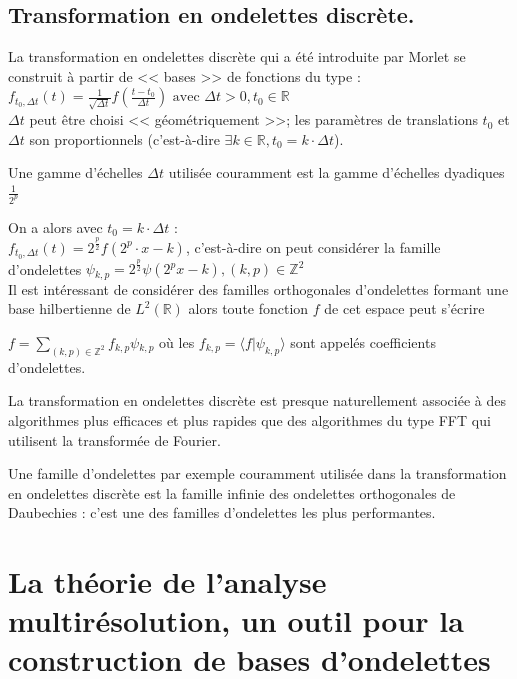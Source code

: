 \documentclass{article}
\begin{document}
\subsection{Transformation en ondelettes discrète.}

La transformation en ondelettes discrète qui a été introduite par Morlet se construit à partir de << bases >> de fonctions du type : \\

$\displaystyle f_{t_{0},\Delta{}t}(t) = \frac{1}{\sqrt{\Delta{}t}}f\left(\frac{t-t_0}{\Delta{}t}\right) \text{ avec } \Delta{}t > 0, t_0 \in \mathbb{R}$ \\

$\Delta{}t$ peut être choisi << géométriquement >>; les paramètres de translations $t_0$ et $\Delta{}t$ son proportionnels (c'est-à-dire $\exists k \in \mathbb{R}, t_0 = k\cdot{}\Delta{}t$).

Une gamme d'échelles $\Delta{}t$ utilisée couramment est la gamme d'échelles dyadiques $\frac{1}{2^p}$

On a alors avec $t_0 = k\cdot\Delta{}t$ : \\

$\displaystyle f_{t_{0},\Delta{}t}(t) = 2^{\frac{p}{2}}f(2^{p}\cdot{}x - k)$, c'est-à-dire on peut considérer la famille d'ondelettes $\psi{}_{k,p} = 2^{\frac{p}{2}}\psi{}(2^{p}x - k ), (k,p) \in \mathbb{Z}^2$ \\

Il est intéressant de considérer des familles orthogonales d'ondelettes formant une base hilbertienne de $L^2(\mathbb{R})$ alors toute fonction $f$ de cet espace peut s'écrire 

$\displaystyle f = \sum_{(k,p) \in \mathbb{Z}^2}f_{k,p}\psi{}_{k,p}$ où les $f_{k,p} = \langle{}f|\psi_{k,p}\rangle$ sont appelés coefficients d'ondelettes.

La transformation en ondelettes discrète est presque naturellement associée à des algorithmes plus efficaces et plus rapides que des algorithmes du type FFT qui utilisent la transformée de Fourier.

Une famille d’ondelettes par exemple couramment utilisée dans la transformation en ondelettes discrète est la famille infinie des ondelettes orthogonales de Daubechies : c’est une des familles d’ondelettes les plus performantes.


\section{La théorie de l'analyse multirésolution, un outil pour la construction de bases d'ondelettes}
\end{document}
